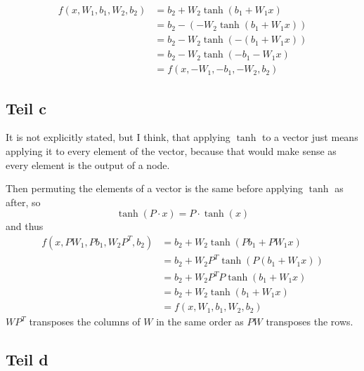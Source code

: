 \documentclass[10pt,a4paper]{article}
\begin{document}
\begin{align*}
  f(x, W_{1}, b_{1}, W_{2}, b_{2}) & = b_{2} + W_{2} \tanh(b_{1} + W_{1}x)\\
                                   & = b_{2} - (-W_{2} \tanh(b_{1} + W_{1}x))\\
                                   & = b_{2} - W_{2} \tanh(-(b_{1} + W_{1}x))\\
                                   & = b_{2} - W_{2} \tanh(-b_{1} - W_{1}x)\\
                                   & = f(x, -W_{1}, -b_{1}, -W_{2}, b_{2})
\end{align*}

\subsection{Teil c}

It is not explicitly stated, but I think, that applying $\tanh$ to a vector just
means applying it to every element of the vector, because that would make sense
as every element is the output of a node.

Then permuting the elements of a vector is the same before applying $\tanh$ as
after, so
\begin{equation}
  \tanh(P \cdot x) = P \cdot \tanh(x)
\end{equation}
and thus
\begin{align*}
  f(x, PW_{1}, Pb_{1}, W_{2}P^{T}, b_{2}) & = b_{2} + W_{2} \tanh(Pb_{1} + PW_{1}x)\\
                                     & = b_{2} + W_{2} P^{T} \tanh(P(b_{1} + W_{1}x))\\
                                     & = b_{2} + W_{2} P^{T} P\tanh(b_{1} + W_{1}x)\\
                                     & = b_{2} + W_{2} \tanh(b_{1} + W_{1}x)\\
                                     & = f(x, W_{1}, b_{1}, W_{2}, b_{2})
\end{align*}
$WP^{T}$ transposes the columns of $W$ in the same order as $PW$ transposes the
rows.

\subsection{Teil d}
\end{document}
